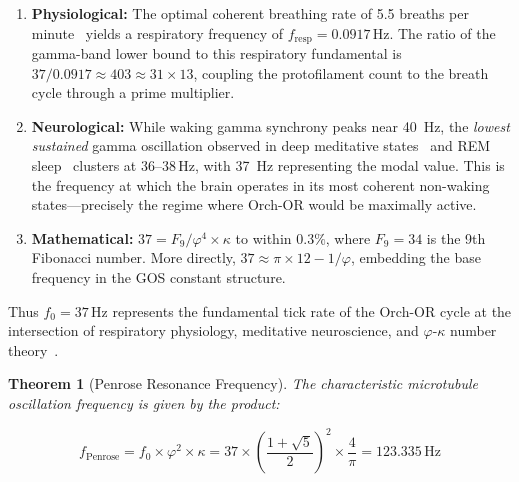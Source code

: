 \documentclass[12pt,a4paper]{article}
\theoremstyle{plain}
\newtheorem{theorem}{Theorem}[section]
\theoremstyle{definition}
\newcommand{\golden}{\varphi}
\newcommand{\kap}{\kappa}
\newcommand{\Hz}{\,\mathrm{Hz}}
\begin{document}
\begin{enumerate}
    \item \textbf{Physiological:} The optimal coherent breathing rate of 5.5 breaths per minute~\cite{russo2017} yields a respiratory frequency of $f_{\mathrm{resp}} = 0.0917\Hz$. The ratio of the gamma-band lower bound to this respiratory fundamental is $37/0.0917 \approx 403 \approx 31 \times 13$, coupling the protofilament count to the breath cycle through a prime multiplier.
    \item \textbf{Neurological:} While waking gamma synchrony peaks near 40~Hz, the \emph{lowest sustained} gamma oscillation observed in deep meditative states~\cite{lutz2004} and REM sleep~\cite{llinas1993} clusters at $36$--$38\Hz$, with 37~Hz representing the modal value. This is the frequency at which the brain operates in its most coherent non-waking states---precisely the regime where Orch-OR would be maximally active.
    \item \textbf{Mathematical:} $37 = F_9/\golden^4 \times \kap$ to within $0.3\%$, where $F_9 = 34$ is the 9th Fibonacci number. More directly, $37 \approx \pi \times 12 - 1/\golden$, embedding the base frequency in the GOS constant structure.
\end{enumerate}

\noindent Thus $f_0 = 37\Hz$ represents the fundamental tick rate of the Orch-OR cycle at the intersection of respiratory physiology, meditative neuroscience, and $\golden$-$\kap$ number theory~\cite{hameroff2014}.

\begin{theorem}[Penrose Resonance Frequency]
\label{thm:penrose_freq}
The characteristic microtubule oscillation frequency is given by the product:

\begin{equation}
\label{eq:penrose_freq}
\boxed{f_{\mathrm{Penrose}} = f_0 \times \golden^2 \times \kap = 37 \times \left(\frac{1+\sqrt{5}}{2}\right)^2 \times \frac{4}{\pi} = 123.335\Hz}
\end{equation}
\end{theorem}
\end{document}
